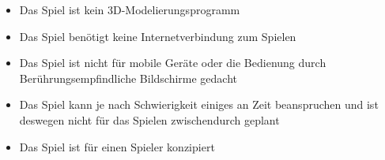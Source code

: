 \begin{itemize}



\item Das Spiel ist kein 3D-Modelierungsprogramm

\item Das Spiel benötigt keine Internetverbindung zum Spielen
\item Das Spiel ist nicht für mobile Geräte oder die Bedienung durch Berührungsempfindliche Bildschirme gedacht
\item Das Spiel kann je nach Schwierigkeit einiges an Zeit beanspruchen und ist deswegen nicht für das Spielen zwischendurch geplant
\item Das Spiel ist für einen Spieler konzipiert

\end{itemize}